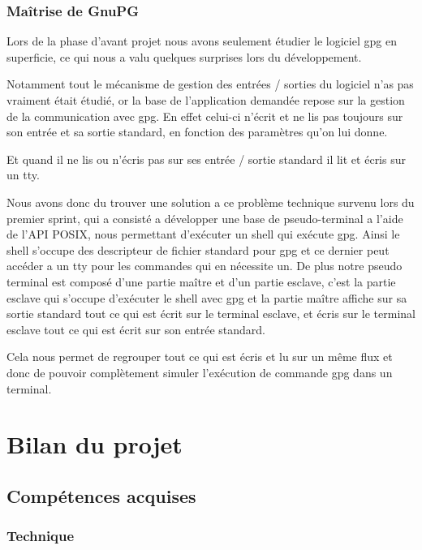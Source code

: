 \documentclass{../res/univ-projet}
\begin{document}
    \subsubsection{Maîtrise de GnuPG}
    
      Lors de la phase d'avant projet nous avons seulement étudier le logiciel gpg
      en superficie, ce qui nous a valu quelques surprises lors du développement.

      Notamment tout le mécanisme de gestion des entrées / sorties du logiciel n'as pas vraiment était
      étudié, or la base de l'application demandée repose sur la gestion de la communication avec
      gpg.
      En effet celui-ci n'écrit et ne lis pas toujours sur son entrée et sa sortie standard,
      en fonction des paramètres qu'on lui donne.

      Et quand il ne lis ou n'écris pas sur ses entrée / sortie standard il lit et écris sur un
      tty.

      Nous avons donc du trouver une solution a ce problème technique survenu lors du premier sprint,
      qui a consisté a développer une base de pseudo-terminal a l'aide de l'API POSIX, nous permettant
      d'exécuter un shell qui exécute gpg.
      Ainsi le shell s'occupe des descripteur de fichier standard pour gpg et ce dernier peut accéder a un tty
      pour les commandes qui en nécessite un.
      De plus notre pseudo terminal est composé d'une partie maître et d'un partie esclave,
      c'est la partie esclave qui s'occupe d'exécuter le shell avec gpg et la partie maître affiche
      sur sa sortie standard tout ce qui est écrit sur le terminal esclave, 
      et écris sur le terminal esclave tout ce qui est écrit sur son entrée standard.

      Cela nous permet de regrouper tout ce qui est écris et lu sur un même flux et donc de pouvoir
      complètement simuler l'exécution de commande gpg dans un terminal.
  

\section{Bilan du projet}
  
  \subsection{Compétences acquises}

    \subsubsection{Technique}
    
\end{document}
